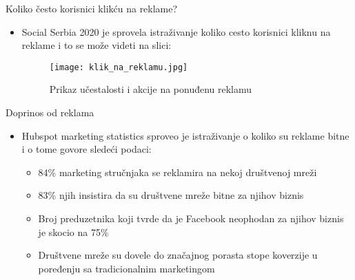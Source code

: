 \documentclass{beamer}
\begin{document}
	
	\begin{frame}{Koliko često korisnici klikću na reklame?}
		
		\begin{itemize}
			\item Social Serbia 2020 je sprovela istraživanje koliko cesto korisnici kliknu na reklame i to se može videti na slici:
			\begin{figure}[h!]
				\begin{center}
					\texttt{[image: klik\_na\_reklamu.jpg]}
				\end{center}
				\caption{Prikaz učestalosti i akcije na ponuđenu reklamu}
				\label{fig:klik_na_reklamu}
			\end{figure}
		\end{itemize}
		
	\end{frame}
	
	\begin{frame}{Doprinos od reklama}
		\begin{itemize}
			\item Hubspot marketing statistics sproveo je istraživanje o koliko su reklame bitne i o tome govore sledeći podaci:
			\begin{itemize}
		    	\item 84\% marketing stručnjaka se reklamira na nekoj društvenoj mreži
		    	\item 83\% njih insistira da su društvene mreže bitne za njihov biznis
			    \item Broj preduzetnika koji tvrde da je Facebook neophodan za njihov biznis je skocio na 75\%
			    \item Društvene mreže su dovele do značajnog porasta stope koverzije u poređenju sa tradicionalnim marketingom 
		    \end{itemize}
		\end{itemize}
	\end{frame}
	
\end{document}
